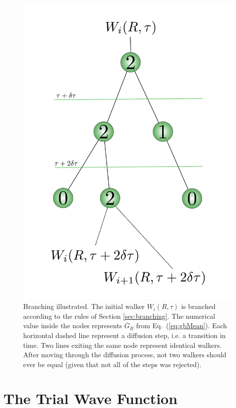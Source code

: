 \begin{figure}
 \begin{center}
  \includegraphics[scale=0.5]{../Graphics/branching.pdf}
  \caption{Branching illustrated. The initial walker $W_i(R, \tau)$ is branched according to the rules of Section \ref{sec:branching}. The numerical value inside the nodes represents $\overline{G}_B$ from Eq.~(\ref{eq:gbMean}). Each horizontal dashed line represent a diffusion step, i.e. a transition in time. Two lines exiting the same node represent identical walkers. After moving through the diffusion process, not two walkers should ever be equal (given that not all of the steps was rejected).}
  \label{fig:branching}
 \end{center}
\end{figure}
\clearpage

\section{The Trial Wave Function}
\label{sec:trialWF}

